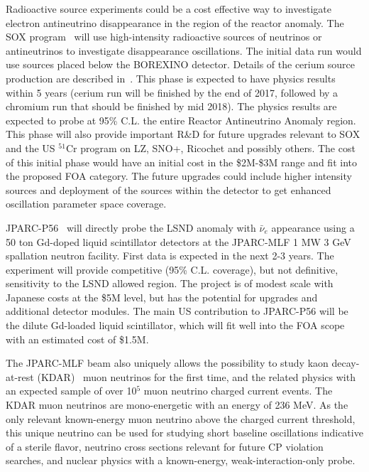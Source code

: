 \noindent Radioactive source experiments could be a cost effective way
to investigate electron antineutrino disappearance in the region of
the reactor anomaly.  The SOX program~\cite{bib:SOX} will use
high-intensity radioactive sources of neutrinos or antineutrinos to
investigate disappearance oscillations.  The initial data run would
use sources placed below the BOREXINO detector.  Details of the cerium
source production are described in~\cite{bib:CL}. This phase is
expected to have physics results within 5 years (cerium run will be
finished by the end of 2017, followed by a chromium run that should be
finished by mid 2018).  The physics results are expected to probe at
95\% C.L. the entire Reactor Antineutrino Anomaly region. This phase
will also provide important R\&D for future upgrades relevant to SOX
and the US $^{51}$Cr program on LZ, SNO+, Ricochet and possibly
others.  The cost of this initial phase would have an initial cost in
the \$2M-\$3M range and fit into the proposed FOA category.  The
future upgrades could include higher intensity sources and deployment
of the sources within the detector to get enhanced oscillation
parameter space coverage.


\noindent JPARC-P56~\cite{JPARC_P_56} will directly probe the LSND
anomaly with $\bar\nu_e$ appearance using a 50 ton Gd-doped liquid
scintillator detectors at the JPARC-MLF 1 MW 3 GeV spallation neutron
facility.  First data is expected in the next 2-3 years. The
experiment will provide competitive (95\% C.L. coverage), but not
definitive, sensitivity to the LSND allowed region. The project is of
modest scale with Japanese costs at the \$5M level, but has the
potential for upgrades and additional detector modules.  The main US
contribution to JPARC-P56 will be the dilute Gd-loaded liquid
scintillator, which will fit well into the FOA scope with an estimated
cost of \$1.5M.

The JPARC-MLF beam also uniquely allows the possibility to study kaon
decay-at-rest (KDAR)~\cite{KDAR} muon neutrinos for the first time,
and the related physics with an expected sample of over 10$^5$ muon
neutrino charged current events.  The KDAR muon neutrinos are
mono-energetic with an energy of 236 MeV.  As the only relevant
known-energy muon neutrino above the charged current threshold, this
unique neutrino can be used for studying short baseline oscillations
indicative of a sterile flavor, neutrino cross sections relevant for
future CP violation searches, and nuclear physics with a known-energy,
weak-interaction-only probe.

